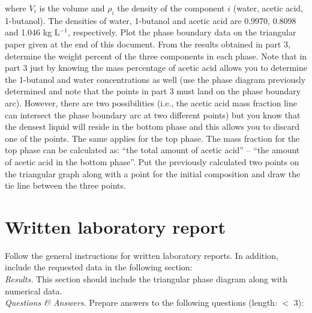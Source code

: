 \documentclass[byrevtex,amssymb,aps,pra,floatfix,letterpaper]{revtex4}
\begin{document}
\noindent
where $V_i$ is the volume and $\rho_i$ the density of the component $i$ (water, acetic acid, 1-butanol).  The densities of water, 1-butanol and acetic acid are 0.9970, 0.8098 and 1.046 kg L$^{-1}$, respectively. Plot the phase boundary data on the triangular paper given at the end of this document. From the results obtained in part 3, determine the weight percent of the three components in each phase. Note that in part 3 just by knowing the mass percentage of acetic acid allows you to determine the 1-butanol and water concentrations as well (use the phase diagram previously determined and note that the points in part 3 must land on the phase boundary arc). However, there are two possibilities (i.e., the acetic acid mass fraction line can intersect the phase boundary arc at two different points) but you know that the densest liquid will reside in the bottom phase and this allows you to discard one of the points. The same applies for the top phase. The mass fraction for the top phase can be calculated as: ``the total amount of acetic acid'' -- ``the amount of acetic acid in the bottom phase''. Put the previously calculated two points on the triangular graph along with a point for the initial composition and draw the tie line between the three points.

\section{Written laboratory report}

Follow the general instructions for written laboratory reports. In addition, include the requested data in the following section:\\

\noindent
\textit{Results.} This section should include the triangular phase diagram along with numerical data.\\

\noindent
\textit{Questions \& Answers.} Prepare answers to the following questions (length: $<$ 3):\\
\end{document}
